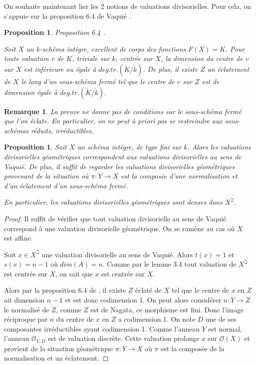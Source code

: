 \documentclass[11pt]{article}
\newtheorem{prop}[thm]{Proposition}
\newtheorem{rem}[thm]{Remarque}
\begin{document}
On souhaite maintenant lier les 2 notions de valuations divisorielles. Pour cela, on s'appuie sur la proposition 6.4 de Vaquié \cite{VaquieValuations}.
\begin{prop} Proposition 6.4 \cite{VaquieValuations}.

Soit $X$ un $k$-schéma intègre, excellent de corps des fonctions $F(X) = K$. Pour toute valuation $v$ de $K$, triviale sur $k$, centrée sur $X$, la dimension du centre de $v$ sur $X$ est inférieure ou égale à $deg.tr.(\tilde{K}/\tilde{k})$. De plus, il existe $Z$ un éclatement de $X$ le long d'un sous-schéma fermé tel que le centre de $v$ sur $Z$ est de dimension égale à $deg.tr.(\tilde{K}/\tilde{k})$.
\end{prop}

\begin{rem}
La preuve ne donne pas de conditions sur le sous-schéma fermé que l'on éclate. En particulier, on ne peut à priori pas se restreindre aux sous-schémas réduits, irréductibles.
\end{rem}

\begin{prop}\label{Les valuations divisorielles sont denses}
Soit $X$ un schéma intègre, de type fini sur $k$. Alors les valuations divisorielles géométriques correspondent aux valuations divisorielles au sens de Vaquié. De plus,  il suffit de regarder les valuations divisorielles géométriques provenant de la situation où  $\pi : Y \rightarrow X$ est la composée d'une normalisation et d'un éclatement d'un sous-schéma fermé.

En particulier, les valuations divisorielles géométriques sont denses dans $X^\beth$.
\end{prop}

\begin{proof}
Il suffit de vérifier que tout valuation divisorielle au sens de Vaquié correspond à une valuation divisorielle géométrique. On se ramène au cas où $X$ est affine. 

Soit $x \in X^\beth$ une valuation divisorielle au sens de Vaquié. Alors $t(x) =1$ et $s(x) =n-1$ où $dim(A) =n$. Comme par le lemme 3.4 tout valuation de $X^\beth$ est centrée sur $X$, on sait que $x$ est centrée sur $X$. 

Alors par la proposition 6.4 de \cite{VaquieValuations}, il existe $Z$ éclaté de $X$ tel que le centre de $x$ en $Z$ ait dimension $n-1$ et est donc codimension 1. On peut alors considérer $n : Y \rightarrow Z$ le normalisé de $Z$, comme $Z$ est de Nagata, ce morphisme est fini. Donc l'image réciproque par $n$ du centre de $x$ en $Z$ a codimension 1. On note $D$ une de ses composantes irréductibles ayant codimension 1. Comme l'anneau $Y$ est normal, l'anneau $\mathcal{O}_{Y,D}$ est de valuation discrète. Cette valuation prolonge $x$ sur $\mathcal{O}(X)$ et provient de la situation géométrique $\pi : Y \rightarrow X$ où $\pi$ est la composée de la normalisation et un éclatement.
\end{proof}
\end{document}
